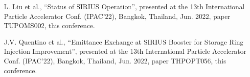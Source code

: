 \documentclass[a4paper,
               keeplastbox,   %
               ]{jacow}
\begin{document}
\begin{thebibliography}{2} %
	
L. Liu et al., \textquotedblleft{Status of SIRIUS Operation}\textquotedblright, presented at the 13th International Particle Accelerator Conf. (IPAC’22), Bangkok, Thailand, Jun. 2022, paper TUPOMS002, this conference.
  
J.V. Quentino et al., \textquotedblleft{Emittance Exchange at SIRIUS Booster for Storage Ring Injection Improvement}\textquotedblright, presented at the 13th International Particle Accelerator Conf. (IPAC’22), Bangkok, Thailand, Jun. 2022, paper THPOPT056, this conference.
  
\end{thebibliography}
\end{document}
